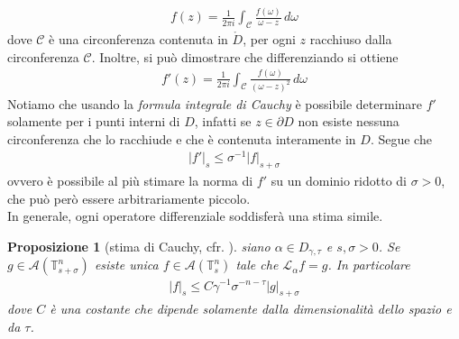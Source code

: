 \documentclass[twoside, 11pt]{amsbook}
\newcommand{\0}{{(0)}}
\newcommand{\3}{{(3)}}
\theoremstyle{colonplain}
\newtheorem{prop}[thm]{Proposizione}
\theoremstyle{colondefinition}
\theoremstyle{colonremark}
\numberwithin{equation}{chapter}
\begin{document}
\begin{align}
    f(z) = \frac{1}{2\pi i}\int_{\mathcal{C}} \frac{f(\omega)}{\omega - z} \, d\omega
\end{align}
dove $\mathcal{C}$ è una circonferenza contenuta in $\mathring{D}$, per ogni $z$ racchiuso dalla circonferenza $\mathcal{C}$. Inoltre, si può dimostrare che differenziando si ottiene
\begin{align}
    f'(z) = \frac{1}{2\pi i}\int_{\mathcal{C}} \frac{f(\omega)}{(\omega - z)^2} \, d\omega
\end{align}
Notiamo che usando la \textit{formula integrale di Cauchy} è possibile determinare $f'$ solamente per i punti interni di $D$, infatti se $z \in \partial D$ non esiste nessuna circonferenza che lo racchiude e che è contenuta interamente in $D$. Segue che
\begin{align}
    |f'|_s \leq \sigma^{-1}|f|_{s + \sigma}
\end{align}
ovvero è possibile al più stimare la norma di $f'$ su un dominio ridotto di $\sigma > 0$, che può però essere arbitrariamente piccolo. \\
In generale, ogni operatore differenziale soddisferà una stima simile.
\begin{prop}[stima di Cauchy, cfr. \cite{Fejoz02}]\label{CauchyEst} siano $\alpha \in D_{\gamma, \tau}$ e $s, \sigma > 0$. Se $g \in \mathcal{A}(\mathbb{T}^n_{s + \sigma})$ esiste unica $f \in \mathcal{A}(\mathbb{T}^n_s)$ tale che $\mathcal{L}_\alpha f = g$. In particolare
\begin{align}
    |f|_s \leq C\gamma^{-1}\sigma^{-n-\tau}|g|_{s + \sigma}
\end{align}
dove $C$ è una costante che dipende solamente dalla dimensionalità dello spazio e da $\tau$.
\end{prop}
\end{document}
